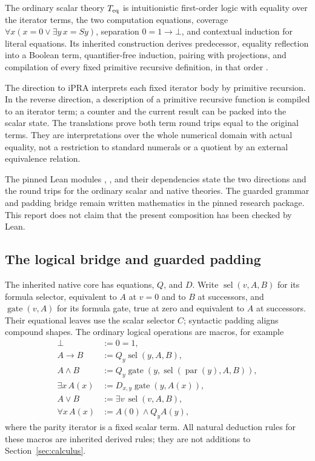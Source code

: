 \documentclass[11pt,letterpaper]{article}
\theoremstyle{definition}
\newcommand{\code}[1]{\texttt{\detokenize{#1}}}
\begin{document}
The ordinary scalar theory $T_{\rm eq}$ is intuitionistic first-order logic
with equality over the iterator terms, the two computation equations,
coverage $\forall x(x=0\lor\exists y\,x=Sy)$, separation $0=1\to\bot$,
and contextual induction for literal equations. Its inherited construction
derives predecessor, equality reflection into a Boolean term,
quantifier-free induction, pairing with projections, and compilation of
every fixed primitive recursive definition, in that order
\cite{foundations,lean}.

The direction to iPRA interprets each fixed iterator body by primitive
recursion. In the reverse direction, a description of a primitive recursive
function is compiled to an iterator term; a counter and the current result
can be packed into the scalar state. The translations prove both term
round trips equal to the original terms. They are interpretations over the
whole numerical domain with actual equality, not a restriction to standard
numerals or a quotient by an external equivalence relation.

The pinned Lean modules \code{BiInterpretation},
\code{NativeBiInterpretation}, and their dependencies state the two
directions and the round trips for the ordinary scalar and native theories.
The guarded grammar and padding bridge remain written mathematics in the
pinned research package. This report does not claim that the present
composition has been checked by Lean.

\subsection{The logical bridge and guarded padding}

The inherited native core has equations, $Q$, and $D$. Write
$\operatorname{sel}(v,A,B)$ for its formula selector, equivalent to $A$
at $v=0$ and to $B$ at successors, and $\operatorname{gate}(v,A)$ for its
formula gate, true at zero and equivalent to $A$ at successors. Their
equational leaves use the scalar selector $C$; syntactic padding aligns
compound shapes. The ordinary logical operations are macros, for example
\[
\begin{aligned}
 \bot&:=0=1,\\
 A\to B&:=Q_y\operatorname{sel}(y,A,B),\\
 A\wedge B&:=Q_y\operatorname{gate}
       (y,\operatorname{sel}(\operatorname{par}(y),A,B)),\\
 \exists x\,A(x)&:=D_{x,y}\operatorname{gate}(y,A(x)),\\
 A\vee B&:=\exists v\,\operatorname{sel}(v,A,B),\\
 \forall x\,A(x)&:=A(0)\wedge Q_yA(y),
\end{aligned}
\]
where the parity iterator is a fixed scalar term. All natural deduction
rules for these macros are inherited derived rules; they are not additions
to Section~\ref{sec:calculus}.
\end{document}
